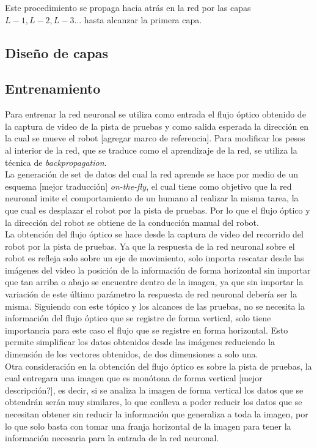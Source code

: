 \documentclass{iccmemoria}
\begin{document}
Este procedimiento se propaga hacia atrás en la red por las capas $L-1, L-2, L-3...$ hasta alcanzar la primera capa.

\subsection{Diseño de capas}

\subsection{Entrenamiento}

Para entrenar la red neuronal se utiliza como entrada el flujo óptico obtenido de la captura de video de la pista de pruebas y como salida esperada la dirección en la cual se mueve el robot [agregar marco de referencia]. Para modificar los pesos al interior de la red, que se traduce como el aprendizaje de la red, se utiliza la técnica de \emph{backpropagation}.\\

La generación de set de datos del cual la red aprende se hace por medio de un esquema [mejor traducción] \emph{on-the-fly}, el cual tiene como objetivo que la red neuronal imite el comportamiento de un humano al realizar la misma tarea, la que cual es desplazar el robot por la pista de pruebas. Por lo que el flujo óptico y la dirección del robot se obtiene de la conducción manual del robot.\\

La obtención del flujo óptico se hace desde la captura de video del recorrido del robot por la pista de pruebas. Ya que la respuesta de la red neuronal sobre el robot es refleja solo sobre un eje de movimiento, solo importa rescatar desde las imágenes del video la posición de la información de forma horizontal sin importar que tan arriba o abajo se encuentre dentro de la imagen, ya que sin importar la variación de este último parámetro la respuesta de red neuronal debería ser la misma.
Siguiendo con este tópico y los alcances de las pruebas, no se necesita la información del flujo óptico que se registre de forma vertical, solo tiene importancia para este caso el flujo que se registre en forma horizontal. Esto permite simplificar los datos obtenidos desde las imágenes reduciendo la dimensión de los vectores obtenidos, de dos dimensiones a solo una.\\

Otra consideración en la obtención del flujo óptico es sobre la pista de pruebas, la cual entregara una imagen que es monótona de forma vertical [mejor descripción?], es decir, si se analiza la imagen de forma vertical los datos que se obtendrán serán muy similares, lo que conlleva a poder reducir los datos que se necesitan obtener sin reducir la información que generaliza a toda la imagen, por lo que solo basta con tomar una franja horizontal de la imagen para tener la información necesaria para la entrada de la red neuronal.\\
\end{document}
